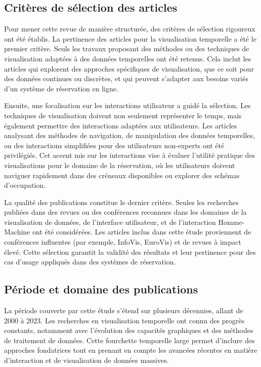 \documentclass[runningheads]{llncs}
\begin{document}
\subsection{Critères de sélection des articles}
Pour mener cette revue de manière structurée, des critères de sélection rigoureux ont été établis. La pertinence des articles pour la visualisation temporelle a été le premier critère. Seuls les travaux proposant des méthodes ou des techniques de visualisation adaptées à des données temporelles ont été retenus. Cela inclut les articles qui explorent des approches spécifiques de visualisation, que ce soit pour des données continues ou discrètes, et qui peuvent s’adapter aux besoins variés d’un système de réservation en ligne.

Ensuite, une focalisation sur les interactions utilisateur a guidé la sélection. Les techniques de visualisation doivent non seulement représenter le temps, mais également permettre des interactions adaptées aux utilisateurs. Les articles analysant des méthodes de navigation, de manipulation des données temporelles, ou des interactions simplifiées pour des utilisateurs non-experts ont été privilégiés. Cet accent mis sur les interactions vise à évaluer l’utilité pratique des visualisations pour le domaine de la réservation, où les utilisateurs doivent naviguer rapidement dans des créneaux disponibles ou explorer des schémas d’occupation.

La qualité des publications constitue le dernier critère. Seules les recherches publiées dans des revues ou des conférences reconnues dans les domaines de la visualisation de données, de l’interface utilisateur, et de l’interaction Homme-Machine ont été considérées. Les articles inclus dans cette étude proviennent de conférences influentes (par exemple, InfoVis, EuroVis) et de revues à impact élevé. Cette sélection garantit la validité des résultats et leur pertinence pour des cas d'usage appliqués dans des systèmes de réservation.

\subsection{Période et domaine des publications}
La période couverte par cette étude s’étend sur plusieurs décennies, allant de 2000 à 2023. Les recherches en visualisation temporelle ont connu des progrès constants, notamment avec l’évolution des capacités graphiques et des méthodes de traitement de données. Cette fourchette temporelle large permet d’inclure des approches fondatrices tout en prenant en compte les avancées récentes en matière d’interaction et de visualisation de données massives.
\end{document}
